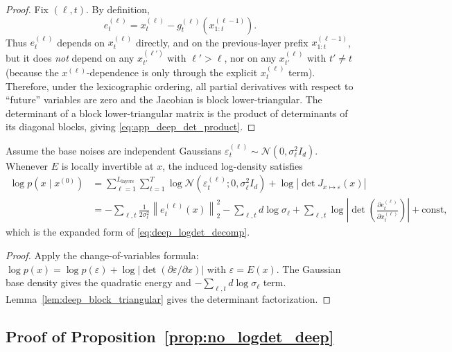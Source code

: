 \documentclass[11pt]{article}
\begin{document}
\begin{proof}
Fix $(\ell,t)$. By definition,
\[
e^{(\ell)}_t = x^{(\ell)}_t - g^{(\ell)}_t(x^{(\ell-1)}_{1:t}).
\]
Thus $e^{(\ell)}_t$ depends on $x^{(\ell)}_t$ directly, and on the previous-layer prefix $x^{(\ell-1)}_{1:t}$,
but it does \emph{not} depend on any $x^{(\ell')}_{t'}$ with $\ell'>\ell$, nor on any $x^{(\ell)}_{t'}$ with $t'\ne t$
(because the $x^{(\ell)}$-dependence is only through the explicit $x^{(\ell)}_t$ term).
Therefore, under the lexicographic ordering, all partial derivatives with respect to ``future'' variables
are zero and the Jacobian is block lower-triangular.
The determinant of a block lower-triangular matrix is the product of determinants of its diagonal blocks,
giving \eqref{eq:app_deep_det_product}.
\end{proof}

\begin{corollary}
\label{cor:deep_loglik_decomp}
Assume the base noises are independent Gaussians
$\varepsilon^{(\ell)}_t\sim\mathcal{N}(0,\sigma_\ell^2 I_d)$.
Whenever $E$ is locally invertible at $x$, the induced log-density satisfies
\begin{align}
\log p(x\mid x^{(0)})
&=
\sum_{\ell=1}^{L_{\mathrm{layers}}}\sum_{t=1}^T
\log \mathcal{N}\!\left(\varepsilon^{(\ell)}_t; 0,\sigma_\ell^2 I_d\right)
+
\log\left|\det J_{x\mapsto\varepsilon}(x)\right| \nonumber\\
&=
-\sum_{\ell,t}\frac{1}{2\sigma_\ell^2}\left\|e^{(\ell)}_t(x)\right\|_2^2
-\sum_{\ell,t} d\log\sigma_\ell
+
\sum_{\ell,t}\log\left|\det\!\left(\frac{\partial e^{(\ell)}_t}{\partial x^{(\ell)}_t}\right)\right|
+\mathrm{const},
\label{eq:app_deep_loglik}
\end{align}
which is the expanded form of \eqref{eq:deep_logdet_decomp}.
\end{corollary}

\begin{proof}
Apply the change-of-variables formula:
$\log p(x)=\log p(\varepsilon)+\log|\det(\partial \varepsilon/\partial x)|$
with $\varepsilon=E(x)$.
The Gaussian base density gives the quadratic energy and $-\sum_{\ell,t}d\log\sigma_\ell$ term.
Lemma~\ref{lem:deep_block_triangular} gives the determinant factorization.
\end{proof}

\subsection{Proof of Proposition~\ref{prop:no_logdet_deep}}
\label{app:proof_no_logdet_deep}
\end{document}
